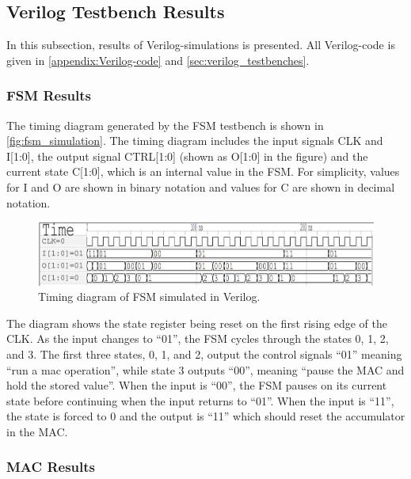 \subsection{Verilog Testbench Results}

In this subsection, results of Verilog-simulations is presented. All Verilog-code is given in \autoref{appendix:Verilog-code} and \ref{sec:verilog_testbenches}.

\subsubsection{FSM Results}
\label{subsubsec:fsm_results}

\noindent
The timing diagram generated by the FSM testbench is shown in \autoref{fig:fsm_simulation}. The timing diagram includes the input signals CLK and I[1:0], the output signal CTRL[1:0] (shown as O[1:0] in the figure) and the current state C[1:0], which is an internal value in the FSM. For simplicity, values for I and O are shown in binary notation and values for C are shown in decimal notation.

\begin{figure}[H]
    \centering
    \includegraphics[width=\textwidth]{Figures/FSM_testbench_out.png}
    \caption{Timing diagram of FSM simulated in Verilog.}
    \label{fig:fsm_simulation}
\end{figure}

The diagram shows the state register being reset on the first rising edge of the CLK. As the input changes to ``01'', the FSM cycles through the states 0, 1, 2, and 3. The first three states, 0, 1, and 2, output the control signals ``01'' meaning ``run a mac operation'', while state 3 outputs ``00'', meaning ``pause the MAC and hold the stored value''. When the input is ``00'', the FSM pauses on its current state before continuing when the input returns to ``01''. When the input is ``11'', the state is forced to 0 and the output is ``11'' which should reset the accumulator in the MAC.

\subsubsection{MAC Results}
\label{subsubsec:mac_results}

